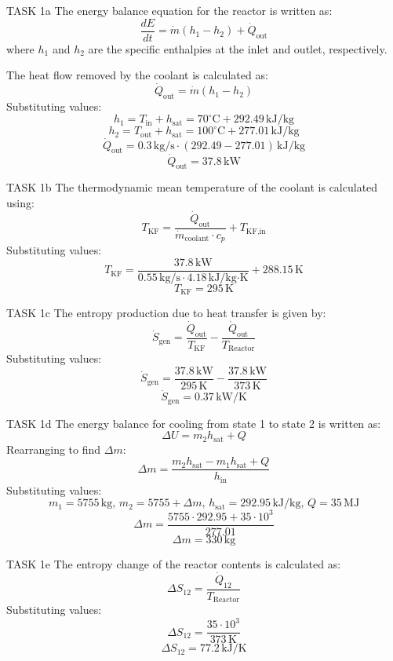 TASK 1a  
The energy balance equation for the reactor is written as:  
\[
\frac{dE}{dt} = \dot{m}(h_1 - h_2) + \dot{Q}_{\text{out}}
\]  
where \( h_1 \) and \( h_2 \) are the specific enthalpies at the inlet and outlet, respectively.  

The heat flow removed by the coolant is calculated as:  
\[
\dot{Q}_{\text{out}} = \dot{m}(h_1 - h_2)
\]  
Substituting values:  
\[
h_1 = T_{\text{in}} + h_{\text{sat}} = 70^\circ\text{C} + 292.49 \, \text{kJ/kg}
\]  
\[
h_2 = T_{\text{out}} + h_{\text{sat}} = 100^\circ\text{C} + 277.01 \, \text{kJ/kg}
\]  
\[
\dot{Q}_{\text{out}} = 0.3 \, \text{kg/s} \cdot (292.49 - 277.01) \, \text{kJ/kg}
\]  
\[
\dot{Q}_{\text{out}} = 37.8 \, \text{kW}
\]  

TASK 1b  
The thermodynamic mean temperature of the coolant is calculated using:  
\[
T_{\text{KF}} = \frac{\dot{Q}_{\text{out}}}{\dot{m}_{\text{coolant}} \cdot c_p} + T_{\text{KF,in}}
\]  
Substituting values:  
\[
T_{\text{KF}} = \frac{37.8 \, \text{kW}}{0.55 \, \text{kg/s} \cdot 4.18 \, \text{kJ/kg·K}} + 288.15 \, \text{K}
\]  
\[
T_{\text{KF}} = 295 \, \text{K}
\]  

TASK 1c  
The entropy production due to heat transfer is given by:  
\[
\dot{S}_{\text{gen}} = \frac{\dot{Q}_{\text{out}}}{T_{\text{KF}}} - \frac{\dot{Q}_{\text{out}}}{T_{\text{Reactor}}}
\]  
Substituting values:  
\[
\dot{S}_{\text{gen}} = \frac{37.8 \, \text{kW}}{295 \, \text{K}} - \frac{37.8 \, \text{kW}}{373 \, \text{K}}
\]  
\[
\dot{S}_{\text{gen}} = 0.37 \, \text{kW/K}
\]  

TASK 1d  
The energy balance for cooling from state 1 to state 2 is written as:  
\[
\Delta U = m_2 h_{\text{sat}} + Q
\]  
Rearranging to find \( \Delta m \):  
\[
\Delta m = \frac{m_2 h_{\text{sat}} - m_1 h_{\text{sat}} + Q}{h_{\text{in}}}
\]  
Substituting values:  
\[
m_1 = 5755 \, \text{kg}, \, m_2 = 5755 + \Delta m, \, h_{\text{sat}} = 292.95 \, \text{kJ/kg}, \, Q = 35 \, \text{MJ}
\]  
\[
\Delta m = \frac{5755 \cdot 292.95 + 35 \cdot 10^3}{277.01}
\]  
\[
\Delta m = 330 \, \text{kg}
\]  

TASK 1e  
The entropy change of the reactor contents is calculated as:  
\[
\Delta S_{12} = \frac{\dot{Q}_{12}}{T_{\text{Reactor}}}
\]  
Substituting values:  
\[
\Delta S_{12} = \frac{35 \cdot 10^3}{373 \, \text{K}}
\]  
\[
\Delta S_{12} = 77.2 \, \text{kJ/K}
\]